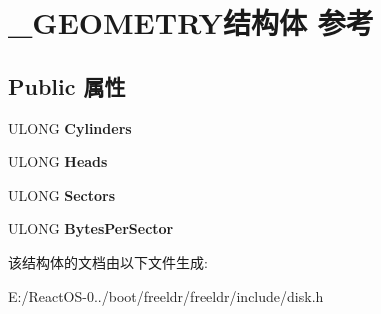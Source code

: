 \hypertarget{struct___g_e_o_m_e_t_r_y}{}\section{\+\_\+\+G\+E\+O\+M\+E\+T\+R\+Y结构体 参考}
\label{struct___g_e_o_m_e_t_r_y}
\subsection*{Public 属性}
\begin{DoxyCompactItemize}
\item 
\mbox{\label{struct___g_e_o_m_e_t_r_y_a70a516ffe71aba3b7537a2adc94be714}} 
U\+L\+O\+NG {\bfseries Cylinders}
\item 
\mbox{\label{struct___g_e_o_m_e_t_r_y_ad647d12502fe3ba961600b6e3ef72db1}} 
U\+L\+O\+NG {\bfseries Heads}
\item 
\mbox{\label{struct___g_e_o_m_e_t_r_y_a41140ae06fbad4e73e5d1a4cb4d6121a}} 
U\+L\+O\+NG {\bfseries Sectors}
\item 
\mbox{\label{struct___g_e_o_m_e_t_r_y_a4101eb76c4998f4dc696172d0cf0224a}} 
U\+L\+O\+NG {\bfseries Bytes\+Per\+Sector}
\end{DoxyCompactItemize}


该结构体的文档由以下文件生成\+:\begin{DoxyCompactItemize}
\item 
E\+:/\+React\+O\+S-\/0../boot/freeldr/freeldr/include/disk.\+h\end{DoxyCompactItemize}
